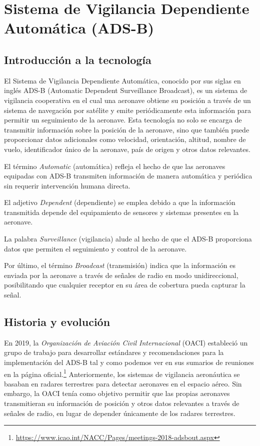 \documentclass[a4paper, 11pt]{book}
\begin{document}
\section{Sistema de Vigilancia Dependiente Automática (ADS-B)}
\label{sec:adsb}
\subsection{Introducción a la tecnología}
El Sistema de Vigilancia Dependiente Automática, conocido por sus siglas en inglés \textsc{ADS-B} (Automatic Dependent Surveillance Broadcast), es un sistema de vigilancia cooperativa en el cual una aeronave obtiene su posición a través de un sistema de navegación por satélite y emite periódicamente esta información para permitir un seguimiento de la aeronave.
Esta tecnología no solo se encarga de transmitir información sobre la posición de la aeronave, sino que también puede proporcionar datos adicionales como velocidad, orientación, altitud, nombre de vuelo, identificador único de la aeronave, país de origen y otros datos relevantes.


El término \emph{Automatic} (automática) refleja el hecho de que las aeronaves equipadas con \textsc{ADS-B} transmiten información de manera automática y periódica sin requerir intervención humana directa.


El adjetivo \emph{Dependent} (dependiente) se emplea debido a que la información transmitida depende del equipamiento de sensores y sistemas presentes en la aeronave.


La palabra \emph{Surveillance} (vigilancia) alude al hecho de que el \textsc{ADS-B} proporciona datos que permiten el seguimiento y control de la aeronave.


Por último, el término \emph{Broadcast} (transmisión) indica que la información es enviada por la aeronave a través de señales de radio en modo unidireccional, posibilitando que cualquier receptor en su área de cobertura pueda capturar la señal.
\subsection{Historia y evolución}
En \textsc{2019}, la \emph{Organización de Aviación Civil Internacional} (\textsc{OACI}) estableció un grupo de trabajo para desarrollar estándares y recomendaciones para la implementación del \textsc{ADS-B} tal y como podemos ver en sus sumarios de reuniones en la página oficial.\footnote{\url{https://www.icao.int/NACC/Pages/meetings-2018-adsbout.aspx}}
Anteriormente, los sistemas de vigilancia aeronáutica se basaban en radares terrestres para detectar aeronaves en el espacio aéreo. Sin embargo, la \textsc{OACI} tenía como objetivo permitir que las propias aeronaves transmitieran su información de posición y otros datos relevantes a través de señales de radio, en lugar de depender únicamente de los radares terrestres.
\end{document}
